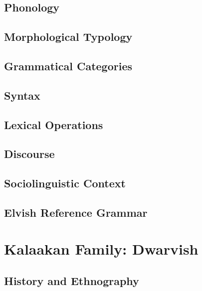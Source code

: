 \documentclass[12pt,letterpaper,openany,twoside]{memoir}
\let\originalpart=\part
\def\part{\cleardoublepage\originalpart}
\begin{document}
\chapter{Phonology}

\chapter{Morphological Typology}

\chapter{Grammatical Categories}

\chapter{Syntax}

\chapter{Lexical Operations}

\chapter{Discourse}

\chapter{Sociolinguistic Context}

\chapter{Elvish Reference Grammar}

\part{Kalaakan Family: Dwarvish}

\chapter{History and Ethnography}
\end{document}
